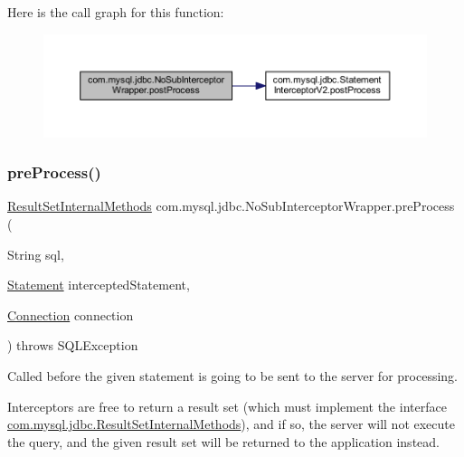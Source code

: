 Here is the call graph for this function\+:
\nopagebreak
\begin{figure}[H]
\begin{center}
\leavevmode
\includegraphics[width=350pt]{classcom_1_1mysql_1_1jdbc_1_1_no_sub_interceptor_wrapper_ad422f02c34900ee0adb87481762f09a7_cgraph}
\end{center}
\end{figure}
\mbox{\label{classcom_1_1mysql_1_1jdbc_1_1_no_sub_interceptor_wrapper_a60bc39ee3aaef8a088cecda8f0f5a831}} 
\subsubsection{\texorpdfstring{pre\+Process()}{preProcess()}}
{\footnotesize\ttfamily \mbox{\hyperlink{interfacecom_1_1mysql_1_1jdbc_1_1_result_set_internal_methods}{Result\+Set\+Internal\+Methods}} com.\+mysql.\+jdbc.\+No\+Sub\+Interceptor\+Wrapper.\+pre\+Process (\begin{DoxyParamCaption}\item[{String}]{sql,  }\item[{\mbox{\hyperlink{interfacecom_1_1mysql_1_1jdbc_1_1_statement}{Statement}}}]{intercepted\+Statement,  }\item[{\mbox{\hyperlink{interfacecom_1_1mysql_1_1jdbc_1_1_connection}{Connection}}}]{connection }\end{DoxyParamCaption}) throws S\+Q\+L\+Exception}

Called before the given statement is going to be sent to the server for processing.

Interceptors are free to return a result set (which must implement the interface \mbox{\hyperlink{interfacecom_1_1mysql_1_1jdbc_1_1_result_set_internal_methods}{com.\+mysql.\+jdbc.\+Result\+Set\+Internal\+Methods}}), and if so, the server will not execute the query, and the given result set will be returned to the application instead.

